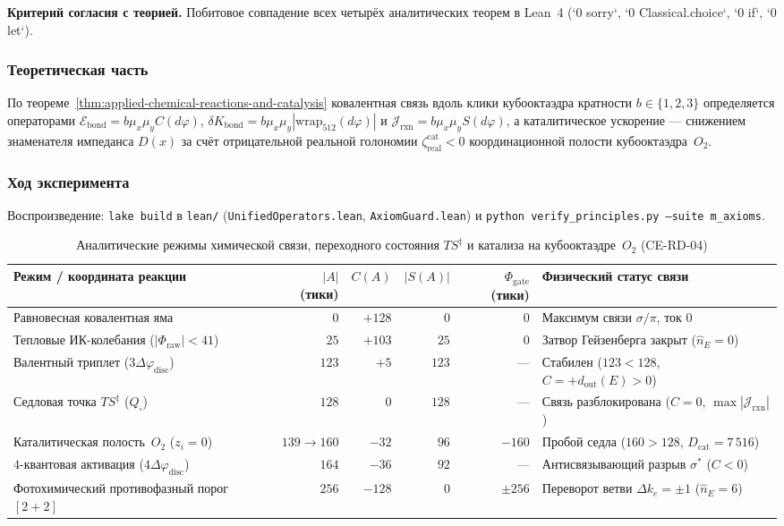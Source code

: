 \textbf{Критерий согласия с теорией.}
Побитовое совпадение всех четырёх аналитических теорем в Lean~4 (`0 sorry`, `0 Classical.choice`, `0 if`, `0 let`).

\subsubsection*{Теоретическая часть}
По теореме~\ref{thm:applied-chemical-reactions-and-catalysis} ковалентная связь вдоль клики кубооктаэдра кратности $b\in\{1,2,3\}$ определяется операторами $\mathcal{E}_{\mathrm{bond}} = b\mu_x\mu_y C(d\varphi)$, $\delta K_{\mathrm{bond}} = b\mu_x\mu_y|\mathrm{wrap}_{512}(d\varphi)|$ и $\mathcal{J}_{\mathrm{rxn}} = b\mu_x\mu_y S(d\varphi)$, а каталитическое ускорение — снижением знаменателя импеданса $D(x)$ за счёт отрицательной реальной голономии $\zeta_{\mathrm{real}}^{\mathrm{cat}} < 0$ координационной полости кубооктаэдра~$O_2$.

\subsubsection*{Ход эксперимента}
Воспроизведение: \texttt{lake build} в \texttt{lean/} (\texttt{UnifiedOperators.lean}, \texttt{AxiomGuard.lean}) и \texttt{python verify\_principles.py --suite m\_axioms}.

\begin{table}[htbp]
\centering
\footnotesize
\setlength{\tabcolsep}{4pt}
\caption{Аналитические режимы химической связи, переходного состояния $TS^\ddagger$ и катализа на кубооктаэдре~$O_2$ (CE-RD-04)}
\label{tab:exp-ce-rd-04}
\begin{tabular}{@{}lrrrrl@{}}
\toprule
Режим / координата реакции & $|A|$ (тики) & $C(A)$ & $|S(A)|$ & $\Phi_{\mathrm{gate}}$ (тики) & Физический статус связи \\
\midrule
Равновесная ковалентная яма & $0$ & $+128$ & $0$ & $0$ & Максимум связи $\sigma/\pi$, ток $0$ \\
Тепловые ИК-колебания ($|\Phi_{\mathrm{raw}}|<41$) & $25$ & $+103$ & $25$ & $0$ & Затвор Гейзенберга закрыт ($\widehat{n}_E=0$) \\
Валентный триплет ($3\Delta\varphi_{\mathrm{disc}}$) & $123$ & $+5$ & $123$ & --- & Стабилен ($123<128$, $C=+d_{\mathrm{out}}(E)>0$) \\
Седловая точка $TS^\ddagger$ ($Q_\square$) & $128$ & $0$ & $128$ & --- & Связь разблокирована ($C=0$, $\max|\mathcal{J}_{\mathrm{rxn}}|$) \\
Каталитическая полость~$O_2$ ($z_i=0$) & $139\to 160$ & $-32$ & $96$ & $-160$ & Пробой седла ($160>128$, $D_{\mathrm{cat}}=7\,516$) \\
$4$-квантовая активация ($4\Delta\varphi_{\mathrm{disc}}$) & $164$ & $-36$ & $92$ & --- & Антисвязывающий разрыв $\sigma^*$ ($C<0$) \\
Фотохимический противофазный порог $[2+2]$ & $256$ & $-128$ & $0$ & $\pm 256$ & Переворот ветви $\Delta k_e=\pm 1$ ($\widehat{n}_E=6$) \\
\bottomrule
\end{tabular}
\end{table}

